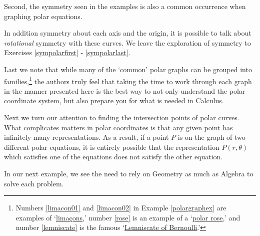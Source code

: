 \smallskip

Second, the symmetry seen in the examples is also a common occurrence when graphing polar equations.  

\smallskip

In addition symmetry about each axis and the origin, it is possible to talk about \textit{rotational} symmetry with these curves.  We leave the exploration of symmetry to Exercises \ref{sympolarfirst} - \ref{sympolarlast}. 

\smallskip

Last we note that while many of the    `common' polar graphs can be grouped into families,\footnote{Numbers \ref{limacon01} and \ref{limacon02} in Example \ref{polargraphex} are examples of `\href{http://en.wikipedia.org/wiki/Limacon}{\underline{lima\c{c}ons}},' number \ref{rose} is an example of a `\href{http://en.wikipedia.org/wiki/Rose_(mathematics)}{\underline{polar rose}},' and number \ref{lemniscate} is the famous `\href{http://en.wikipedia.org/wiki/Lemniscate_of_Bernoulli}{\underline{Lemniscate of Bernoulli}}.'} the authors truly feel that taking the time to work through each graph in the manner presented here is the best way to not only understand the polar coordinate system, but also prepare you for what is needed in Calculus.  

\smallskip

 Next we turn our attention to finding the intersection points of polar curves.  What complicates matters in polar coordinates is that any given point has infinitely many representations.  As a result, if a point $P$ is on the graph of two different polar equations, it is entirely possible that the representation $P(r,\theta)$ which satisfies one of the equations does not satisfy the other equation.
 
 \smallskip
 
In our next example, we see the need to rely on Geometry as much as Algebra to solve each problem.

\smallskip

